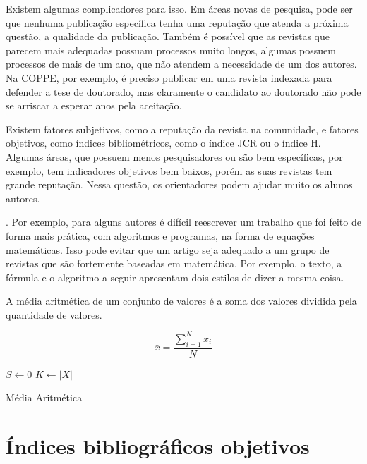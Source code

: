 \documentclass[openany]{book}
\begin{document}
 Existem algumas complicadores para isso. Em áreas novas de pesquisa, pode ser que nenhuma publicação específica tenha uma reputação que atenda a próxima questão, a qualidade da publicação. Também é possível que as revistas que parecem mais adequadas possuam processos muito longos, algumas possuem processos de mais de um ano, que não atendem a necessidade de um dos autores. Na COPPE, por exemplo, é preciso publicar em uma revista indexada para defender a tese de doutorado, mas claramente o candidato ao doutorado não pode se arriscar a esperar anos pela aceitação.

 Existem fatores subjetivos, como a reputação da revista na comunidade, e fatores objetivos, como índices bibliométricos, como o índice JCR ou o índice H. Algumas áreas, que possuem menos pesquisadores ou são bem específicas, por exemplo, tem indicadores objetivos bem baixos, porém as suas revistas tem grande reputação. Nessa questão, os orientadores podem ajudar muito os alunos autores.

. Por exemplo, para alguns autores é difícil reescrever um trabalho que foi feito de forma mais prática, com algoritmos e programas, na forma de equações matemáticas. Isso pode evitar que um artigo seja adequado a um grupo de revistas que são fortemente baseadas em matemática. Por exemplo, o texto, a fórmula e o algoritmo a seguir apresentam dois estilos de dizer  a mesma coisa.

A média aritmética de um conjunto de valores é a soma dos valores dividida pela quantidade de valores.

\begin{equation}
    \bar{x} = \frac{\sum\limits_{i=1}^{N}x_i}{N}
\end{equation}

\begin{algorithm}
    $S \leftarrow 0$ \;
    $K \leftarrow |X|$ \;
    \caption{Média Aritmética}
\end{algorithm}

\section{Índices bibliográficos objetivos}
\end{document}
